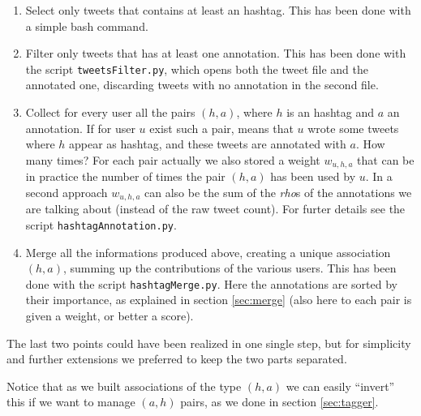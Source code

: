 \documentclass[a4paper,11pt,oneside]{article}
\begin{document}
\begin{enumerate}
\item Select only tweets that contains at least an hashtag. This has been done with a simple bash command.
\item Filter only tweets that has at least one annotation. This has been done with the script \texttt{tweetsFilter.py}, which opens both the tweet file and the annotated one, discarding tweets with no annotation in the second file.
\item Collect for every user all the pairs $(h,a)$, where $h$ is an hashtag and $a$ an annotation. If for user $u$ exist such a pair, means that $u$ wrote some tweets where $h$ appear as hashtag, and these tweets are annotated with $a$. How many times? For each pair actually we also stored a weight $w_{u,h,a}$ that can be in practice the number of times the pair $(h,a)$ has been used by $u$. In a second approach $w_{u,h,a}$ can also be the sum of the \textit{rho}s of the annotations we are talking about (instead of the raw tweet count). For furter details see the script \texttt{hashtagAnnotation.py}.
\item Merge all the informations produced above, creating a unique association $(h,a)$, summing up the contributions of the various users. This has been done with the script \texttt{hashtagMerge.py}. Here the annotations are sorted by their importance, as explained in section \ref{sec:merge} (also here to each pair is given a weight, or better a score).
\end{enumerate}

The last two points could have been realized in one single step, but for simplicity and further extensions we preferred to keep the two parts separated.

Notice that as we built associations of the type $(h,a)$ we can easily ``invert'' this if we want to manage $(a,h)$ pairs, as we done in section \ref{sec:tagger}.
\end{document}
